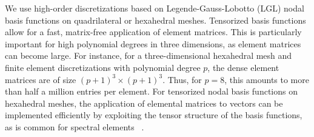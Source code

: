 \documentclass[smallcondensed,final]{svjour3}     %
\newcommand{\todo}[1]{\textcolor{red}{ #1}}
\begin{document}

We use high-order discretizations based on Legende-Gauss-Lobotto
(LGL) nodal basis functions on quadrilateral or hexahedral
meshes. Tensorized basis functions allow for a fast, matrix-free
application of element matrices. This is particularly important for
high polynomial degrees in three dimensions, as element matrices
can become large. For instance, for a three-dimensional hexahedral mesh
and finite element discretizations with polynomial degree $p$, the
dense element
matrices are of size $(p+1)^3\times (p+1)^3$. Thus, for $p=8$, this
amounts to more than half a million entries per element.  For
tensorized nodal basis functions on hexahedral meshes, the application
of elemental matrices to vectors can be implemented efficiently by
exploiting the tensor structure of the basis functions, as is common
for spectral elements ~\cite{DevilleFischerMund02}.
\end{document}
